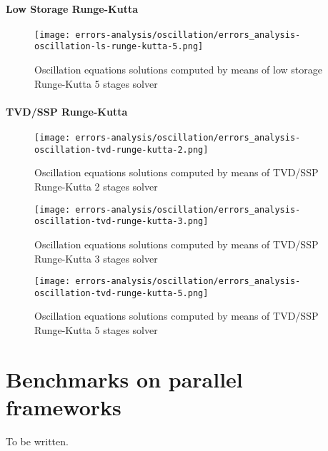 \documentclass[pdftex,preprint,3p,times,numbers]{elsarticle}
\begin{document}
\paragraph{Low Storage Runge-Kutta}

\begin{figure}[!ht]
  \centering
  \texttt{[image: errors-analysis/oscillation/errors\_analysis-oscillation-ls-runge-kutta-5.png]}
  \caption{Oscillation equations solutions computed by means of low storage Runge-Kutta 5 stages solver}\label{fig:results-oscillation-ls-runge-kutta-5}
\end{figure}

\paragraph{TVD/SSP Runge-Kutta}

\begin{figure}[!ht]
  \centering
  \texttt{[image: errors-analysis/oscillation/errors\_analysis-oscillation-tvd-runge-kutta-2.png]}
  \caption{Oscillation equations solutions computed by means of TVD/SSP Runge-Kutta 2 stages solver}\label{fig:results-oscillation-tvd-runge-kutta-2}
\end{figure}

\begin{figure}[!ht]
  \centering
  \texttt{[image: errors-analysis/oscillation/errors\_analysis-oscillation-tvd-runge-kutta-3.png]}
  \caption{Oscillation equations solutions computed by means of TVD/SSP Runge-Kutta 3 stages solver}\label{fig:results-oscillation-tvd-runge-kutta-3}
\end{figure}

\begin{figure}[!ht]
  \centering
  \texttt{[image: errors-analysis/oscillation/errors\_analysis-oscillation-tvd-runge-kutta-5.png]}
  \caption{Oscillation equations solutions computed by means of TVD/SSP Runge-Kutta 5 stages solver}\label{fig:results-oscillation-tvd-runge-kutta-5}
\end{figure}

\clearpage

\section{Benchmarks on parallel frameworks}\label{sec:parallel}

{\color{red} To be written.}
\end{document}
